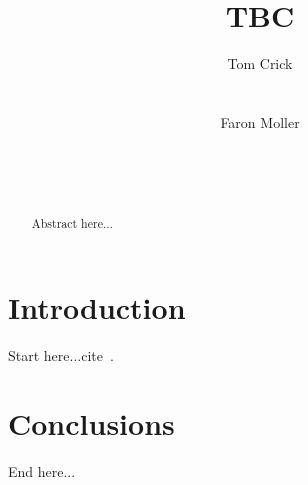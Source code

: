 \documentclass{sig-alternate}
\begin{document}
%

\title{TBC}

\author{
\alignauthor
Tom Crick\\
\\
\\
\alignauthor
Faron Moller\\
\\
\\
\\
}

\maketitle

\begin{abstract}
Abstract here...
\end{abstract}


\section{Introduction}
Start here...cite~\cite{crick+sentance:2011,sentance-et-al-wipsce2012,brown-et-al-sigcse2012,brown-et-al-toce2014}.

\section{Conclusions}
End here...



\end{document}
